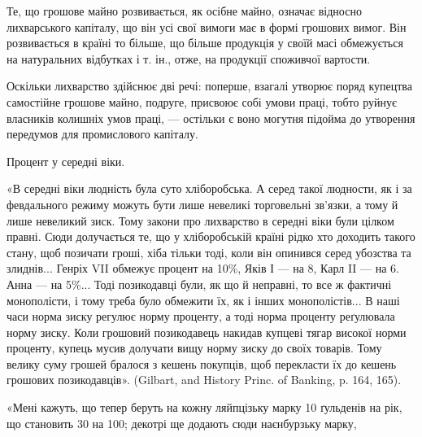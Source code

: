 Те, що грошове майно розвивається, як осібне майно, означає відносно
лихварського капіталу, що він усі свої вимоги має в формі грошових вимог.
Він розвивається в країні то більше, що більше продукція у своїй масі обмежується
на натуральних відбутках і т. ін., отже, на продукції споживчої вартости.

Оскільки лихварство здійснює дві речі: поперше, взагалі утворює поряд
купецтва самостійне грошове майно, подруге, присвоює собі умови праці, тобто
руйнує власників колишніх умов праці, — остільки є воно могутня підойма до
утворення передумов для промислового капіталу.

Процент у середні віки.

«В середні віки людність була суто хліборобська. А серед такої людности,
як і за февдального режиму можуть бути лише невеликі торговельні зв’язки, а
тому й лише невеликий зиск. Тому закони про лихварство в середні віки були
цілком правні. Сюди долучається те, що у хліборобській країні рідко хто доходить
такого стану, щоб позичати гроші, хіба тільки тоді, коли він опинився
серед убозства та злиднів... Генріх VII обмежує процент на 10\%, Яків І —
на 8, Карл II — на 6. Анна — на 5\%... Тоді позикодавці були, як що й неправні,
то все ж фактичні монополісти, і тому треба було обмежити їх, як і інших монополістів...
В наші часи норма зиску регулює норму проценту, а тоді норма проценту
реґулювала норму зиску. Коли грошовий позикодавець накидав купцеві тягар високої
норми проценту, купець мусив долучати вищу норму зиску до своїх товарів.
Тому велику суму грошей бралося з кешень покупців, щоб перекласти їх до кешень
грошових позикодавців». (Gilbart, and History Princ. of Banking, p. 164, 165).

«Мені кажуть, що тепер беруть на кожну ляйпцізьку марку 10 ґульденів
на рік, що становить 30 на 100; декотрі ще додають сюди наєнбурзьку марку,
\parbreak{}  %
